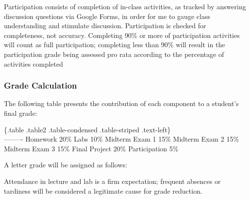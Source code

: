 \documentclass[
]{article}
\begin{document}
Participation consists of completion of in-class activities, as tracked
by answering discussion questions via Google Forms, in order for me to
gauge class understanding and stimulate discussion. Participation is
checked for completeness, not accuracy. Completing 90\% or more of
participation activities will count as full participation; completing
less than 90\% will result in the participation grade being assessed pro
rata according to the percentage of activities completed

\hypertarget{grade-calculation}{%
\subsubsection{Grade Calculation}\label{grade-calculation}}

The following table presents the contribution of each component to a
student's final grade:

\{.table .table2 .table-condensed .table-striped .text-left\} {}
\textbar{} {}\\
-----\textbar---- Homework \textbar{} 20\% Labs \textbar{} 10\% Midterm
Exam 1 \textbar{} 15\% Midterm Exam 2 \textbar{} 15\% Midterm Exam 3
\textbar{} 15\% Final Project \textbar{} 20\% Participation \textbar{}
5\%

A letter grade will be assigned as follows:


Attendance in lecture and lab is a firm expectation; frequent absences
or tardiness will be considered a legitimate cause for grade reduction.
\end{document}
